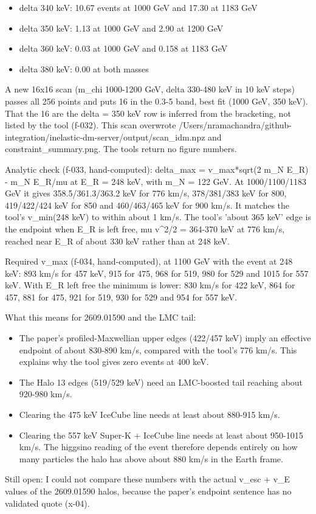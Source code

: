 \documentclass[11pt,a4paper]{article}
\begin{document}
\begin{itemize}
  \item delta 340 keV: 10.67 events at 1000 GeV and 17.30 at 1183 GeV
  \item delta 350 keV: 1.13 at 1000 GeV and 2.90 at 1200 GeV
  \item delta 360 keV: 0.03 at 1000 GeV and 0.158 at 1183 GeV
  \item delta 380 keV: 0.00 at both masses
\end{itemize}
A new 16x16 scan (m\_chi 1000-1200 GeV, delta 330-480 keV in 10 keV steps) passes all 256 points and puts 16 in the 0.3-5 band, best fit (1000 GeV, 350 keV). That the 16 are the delta = 350 keV row is inferred from the bracketing, not listed by the tool (f-032). This scan overwrote /Users/nramachandra/github-integration/inelastic-dm-server/output/scan\_idm.npz and constraint\_summary.png. The tools return no figure numbers.

Analytic check (f-033, hand-computed): delta\_max = v\_max*sqrt(2 m\_N E\_R) - m\_N E\_R/mu at E\_R = 248 keV, with m\_N = 122 GeV. At 1000/1100/1183 GeV it gives 358.5/361.3/363.2 keV for 776 km/s, 378/381/383 keV for 800, 419/422/424 keV for 850 and 460/463/465 keV for 900 km/s. It matches the tool's v\_min(248 keV) to within about 1 km/s. The tool's 'about 365 keV' edge is the endpoint when E\_R is left free, mu v\textasciicircum{}2/2 = 364-370 keV at 776 km/s, reached near E\_R of about 330 keV rather than at 248 keV.

Required v\_max (f-034, hand-computed), at 1100 GeV with the event at 248 keV: 893 km/s for 457 keV, 915 for 475, 968 for 519, 980 for 529 and 1015 for 557 keV. With E\_R left free the minimum is lower: 830 km/s for 422 keV, 864 for 457, 881 for 475, 921 for 519, 930 for 529 and 954 for 557 keV.

What this means for 2609.01590 and the LMC tail:

\begin{itemize}
  \item The paper's profiled-Maxwellian upper edges (422/457 keV) imply an effective endpoint of about 830-890 km/s, compared with the tool's 776 km/s. This explains why the tool gives zero events at 400 keV.
  \item The Halo 13 edges (519/529 keV) need an LMC-boosted tail reaching about 920-980 km/s.
  \item Clearing the 475 keV IceCube line needs at least about 880-915 km/s.
  \item Clearing the 557 keV Super-K + IceCube line needs at least about 950-1015 km/s.
The higgsino reading of the event therefore depends entirely on how many particles the halo has above about 880 km/s in the Earth frame.

\end{itemize}
Still open: I could not compare these numbers with the actual v\_esc + v\_E values of the 2609.01590 halos, because the paper's endpoint sentence has no validated quote (x-04).
\end{document}
